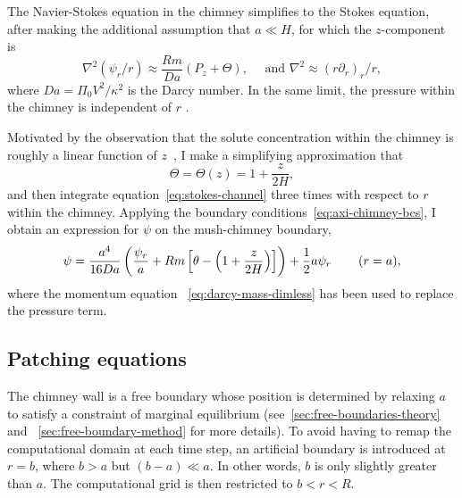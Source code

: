 \documentclass[11pt,twocolumn]{article}
\makeatletter
\newcommand{\specialeqref}[2]{\begingroup
  \def\tagform@##1{\maketag@@@{(\ignorespaces##1\unskip\@@italiccorr#2)}}%
  \eqref{#1}\endgroup}
\makeatother
\begin{document}
The Navier-Stokes equation in the chimney simplifies to the Stokes equation, after making the additional assumption that $a \ll H$, for which the $z$-component is
\begin{equation}
\label{eq:stokes-channel}
\nabla^2 (\psi_r/r) \approx \frac{Rm}{Da} \left(P_z + \Theta \right), \quad \text{ and } \nabla^2 \approx (r \partial_r)_r/r,
\end{equation}
where $Da=\Pi_0 V^2 / \kappa^2$ is the Darcy number. In the same limit, the pressure within the chimney is independent of $r$ \citep*{schulze-worster-98}.

Motivated by the observation that the solute concentration within the chimney is roughly a linear function of $z$~\citep*{rees-jones-worster-13}, I make a simplifying approximation that
\begin{equation}
\Theta = \Theta(z) = 1 + \frac{z}{2H},
\end{equation}
and then integrate equation~\eqref{eq:stokes-channel} three times with respect to $r$ within the chimney. Applying the boundary conditions~\eqref{eq:axi-chimney-bcs}, I obtain an expression for $\psi$ on the mush-chimney boundary,
\begin{equation}
\psi = \frac{a^4}{16 Da} \left(\frac{\psi_r}{a} + Rm \left[ \theta -  \left( 1 + \frac{z}{2H} \right) \right] \right)   + \frac{1}{2} a \psi_r   \hspace{5ex} (r=a),
\end{equation}
where the momentum equation~\specialeqref{eq:darcy-mass-dimless}{a} has been used to replace the pressure term.

\subsection{Patching equations}
\label{sec:patching-equations}
The chimney wall is a free boundary whose position is determined by relaxing $a$ to satisfy a constraint of marginal equilibrium (see~\autoref{sec:free-boundaries-theory} and ~\autoref{sec:free-boundary-method} for more details). To avoid having to remap the computational domain at each time step, an artificial boundary is introduced at $r=b$, where $b > a$ but $(b-a) \ll a$. In other words, $b$ is only slightly greater than $a$. The computational grid is then restricted to $b < r < R$. 
\end{document}
